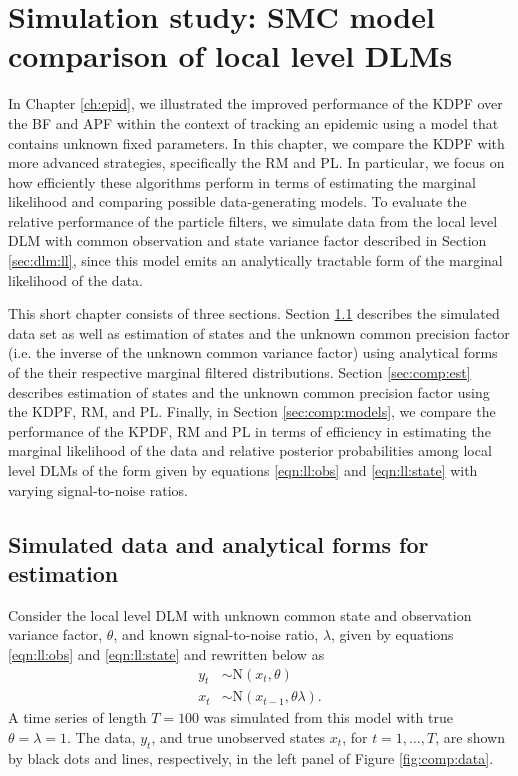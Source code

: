 \chapter{Simulation study: SMC model comparison of local level DLMs \label{ch:comp}}

In Chapter \ref{ch:epid}, we illustrated the improved performance of the KDPF over the BF and APF within the context of tracking an epidemic using a model that contains unknown fixed parameters. In this chapter, we compare the KDPF with more advanced strategies, specifically the RM and PL. In particular, we focus on how efficiently these algorithms perform in terms of estimating the marginal likelihood and comparing possible data-generating models. To evaluate the relative performance of the particle filters, we simulate data from the local level DLM with common observation and state variance factor described in Section \ref{sec:dlm:ll}, since this model emits an analytically tractable form of the marginal likelihood of the data.

This short chapter consists of three sections. Section \ref{sec:comp:data} describes the simulated data set as well as estimation of states and the unknown common precision factor (i.e. the inverse of the unknown common variance factor) using analytical forms of the their respective marginal filtered distributions. Section \ref{sec:comp:est} describes estimation of states and the unknown common precision factor using the KDPF, RM, and PL. Finally, in Section \ref{sec:comp:models}, we compare the performance of the KPDF, RM and PL in terms of efficiency in estimating the marginal likelihood of the data and relative posterior probabilities among local level DLMs of the form given by equations \eqref{eqn:ll:obs} and \eqref{eqn:ll:state} with varying signal-to-noise ratios.

\section{Simulated data and analytical forms for estimation} \label{sec:comp:data}

Consider the local level DLM with unknown common state and observation variance factor, $\theta$, and known signal-to-noise ratio, $\lambda$, given by equations \eqref{eqn:ll:obs} and \eqref{eqn:ll:state} and rewritten below as
\begin{align*}
y_t &\sim \mbox{N}(x_t, \theta) \\
x_t &\sim \mbox{N}(x_{t-1}, \theta\lambda).
\end{align*}
A time series of length $T = 100$ was simulated from this model with true $\theta = \lambda = 1$. The data, $y_t$, and true unobserved states $x_t$, for $t=1,\ldots,T$, are shown by black dots and lines, respectively, in the left panel of Figure \ref{fig:comp:data}.

